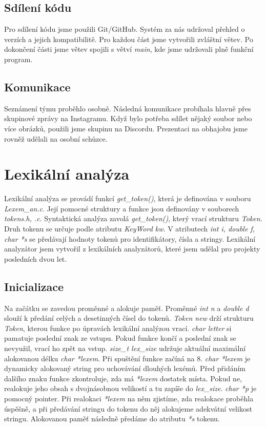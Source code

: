 \documentclass[a4paper, 12pt]{article}
\begin{document}
\subsection{Sdílení kódu}
Pro sdílení kódu jsme použili Git/GitHub. Systém za nás udržoval přehled o verzích a jejich kompatibilitě. Pro každou část jsme vytvořili zvláštní větev. Po dokončení části jsme větev spojili s větví \textit{main}, kde jsme udržovali plně funkční program.
\subsection{Komunikace}
Seznámení týmu proběhlo osobně. Následná komunikace probíhala hlavně přes skupinové zprávy na Instagramu. Když bylo potřeba sdílet nějaký soubor nebo více obrázků, použili jsme skupinu na Discordu. Prezentaci na obhajobu jsme rovněž udělali na osobní schůzce.

\newpage
{}
\section{Lexikální analýza}
Lexikální analýza se provádí funkcí \textit{get\_token()}, která je definována v souboru \textit{Lexem\_an.c}. Její pomocné struktury a funkce jsou definovány v souborech \textit{tokens.h, .c}.\newline
Syntaktická analýza zavolá \textit{get\_token()}, který vrací strukturu \textit{Token}. Druh tokenu se určuje podle atributu \textit{KeyWord kw}. V atributech \textit{int i, double f, char *s} se předávají hodnoty tokenů pro identifikátory, čísla a stringy.\newline
Lexikální analyzátor jsem vytvořil z lexikálních analyzátorů, které jsem udělal pro projekty posledních dvou let.

\subsection{Inicializace}
Na začátku se zavedou proměnné a alokuje paměť.\newline
Proměnné \textit{int n} a \textit{double d} slouží k předání celých a desetinných čísel do tokenů. \textit{Token new} drží strukturu \textit{Token}, kterou funkce po úpravách lexikální analýzou vrací. \textit{char letter} si pamatuje poslední znak ze vstupu. Pokud funkce končí a poslední znak se nevyužil, vrací ho zpět na vstup. \textit{size\_t lex\_size} udržuje aktuální maximální alokovanou délku \textit{char *lexem}. Při spuštění funkce začíná na 8. \textit{char *lexem} je dynamicky alokovaný string pro uchovávání dlouhých lexémů. Před přidáním dalšího znaku funkce zkontroluje, zda má \textit{*lexem} dostatek místa. Pokud ne, realokuje jeho obsah s dvojnásobnou velikostí a tu zapíše do \textit{lex\_size}. \textit{char *p} je pomocný pointer. Při realokaci \textit{*lexem} na něm zjistíme, zda realokace proběhla úspěšně, a při předávání stringu do tokenu do něj alokujeme adekvátní velikost stringu. Alokovanou paměť následně předáme do atributu \textit{*s} tokenu.
\end{document}
